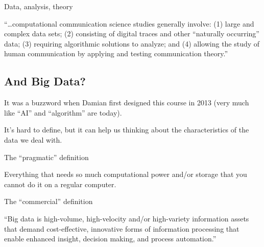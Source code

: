\begin{frame}{Data, analysis, theory}
	\begin{block}{\textcite{VanAtteveldt2018a}}
		``\ldots computational communication science studies generally involve: (1) large and complex data sets; (2) consisting of digital traces and other ``naturally occurring'' data; (3) requiring algorithmic solutions to analyze; and (4) allowing the study of human communication by applying and testing communication theory.''
	\end{block}	
	
\end{frame}





\subsection{And Big Data?}

\begin{frame}[standout]
It was a buzzword when Damian first designed this course in 2013 (very much like ``AI'' and ``algorithm'' are today).

It's hard to define, but it can help us thinking about the characteristics of the data we deal with.
\end{frame}


\begin{frame}{The ``pragmatic'' definition }
	\begin{block}{}
		Everything that needs so much computational power and/or storage that you cannot do it on a regular computer.
	\end{block}
\end{frame}



\begin{frame}{The ``commercial'' definition }
	\begin{block}{\textcite{gartner}}
		``Big data is high-volume, high-velocity and/or high-variety information assets that demand cost-effective, innovative forms of information processing that enable enhanced insight, decision making, and process automation.''
	\end{block}
\end{frame}



